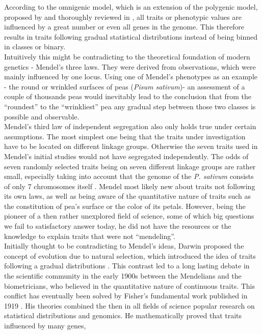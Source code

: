 According to the omnigenic model, which is an extension of the polygenic model, proposed
by \cite{boyle2017expanded} and thoroughly reviewed in \cite{timpson2018}, all traits or
phenotypic values are influenced by a great number or even all genes in the genome. This
therefore results in traits following gradual statistical distributions instead of being
binned in classes or
binary.\\
Intuitively this might be contradicting to the theoretical foundation of modern genetics -
Mendel's three laws. They were derived from observations, which were mainly influenced by
one locus. Using one of Mendel's phenotypes as an example - the round or wrinkled surfaces
of peas (\textit{Pisum sativum})- an assessment of a couple of thousands peas would
inevitably lead to the conclusion that from the ``roundest'' to the ``wrinkliest'' pea any
gradual step between those two classes is
possible and observable. \\
Mendel's third law of independent segregation also only holds true under certain
assumptions. The most simplest one being that the traits under investigation have to be
located on different linkage groups. Otherwise the seven traits used in Mendel's initial
studies would not have segregated independently. The odds of seven randomly selected
traits being on seven different linkage groups are rather small, especially taking into
account that the genome of the \textit{P. sativum} consists of only 7 chromosomes itself
\cite{kalo2004}. Mendel most likely new about traits not following its own laws, as well
as being aware of the quantitative nature of traits such as the constitution of pea's
surface or the color of its petals. However, being the pioneer of a then rather unexplored
field of science, some of which big questions we fail to satisfactory answer today, he did
not have
the resources or the knowledge to explain traits that were not ``mendeling''. \\
Initially thought to be contradicting to Mendel's ideas, Darwin proposed the concept of
evolution due to natural selection, which introduced the idea of traits following a
gradual distributions \cite{darwin1859}. This contrast led to a long lasting debate in the
scientific community in the early 1900s between the Mendelians and the biometricians, who
believed in the quantitative nature of continuous traits. This conflict has eventually
been solved by Fisher's fundamental work published in 1919 \cite{fisher1919xv}. His
theories combined the then in all fields of science popular research on statistical
distributions and genomics. He mathematically proved that traits influenced by many genes,
